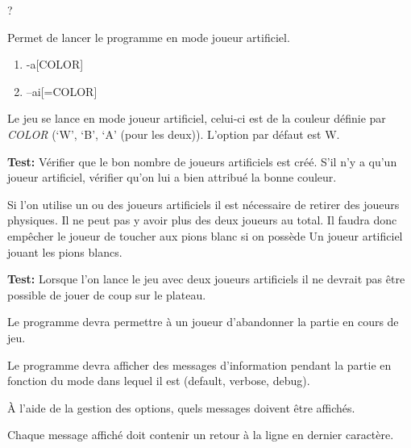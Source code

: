 \documentclass{article}
\begin{document}
\begin{needbox}
    ?
\end{needbox}

\begin{needbox}[F23: Mode IA]
    Permet de lancer le programme en mode joueur artificiel.
    \begin{subneedbox}
        \begin{enumerate}
            \item -a[COLOR]
            \item --ai[=COLOR]
        \end{enumerate}
        Le jeu se lance en mode joueur artificiel, celui-ci est de la couleur
        définie par \textit{COLOR} (`W', `B', `A' (pour les deux)). L'option 
        par défaut est W.

        \textbf{Test:} Vérifier que le bon nombre de joueurs artificiels est créé. 
        S'il n'y a qu'un joueur artificiel, vérifier qu'on lui a bien attribué la bonne
        couleur.
    \end{subneedbox}
    \begin{subneedbox}
        Si l'on utilise un ou des joueurs artificiels il est nécessaire de retirer
        des joueurs physiques. Il ne peut pas y avoir plus des deux joueurs au total.
        Il faudra donc empêcher le joueur de toucher aux pions blanc si on possède Un
        joueur artificiel jouant les pions blancs.

        \textbf{Test:} Lorsque l'on lance le jeu avec deux joueurs artificiels il ne 
        devrait pas être possible de jouer de coup sur le plateau.
    \end{subneedbox}
\end{needbox}

\begin{needbox}[F32: Abandon]
    Le programme devra permettre à un joueur d’abandonner la partie en cours de jeu.
\end{needbox}

\begin{needbox}
    Le programme devra afficher des messages d’information
    pendant la partie en fonction du mode dans lequel il est
    (default, verbose, debug).
    \begin{subneedbox}
        À l'aide de la gestion des options, quels messages doivent être affichés.
    \end{subneedbox}
    \begin{subneedbox}
        Chaque message affiché doit contenir un retour à la ligne en dernier caractère.
    \end{subneedbox}
\end{needbox}
\end{document}
